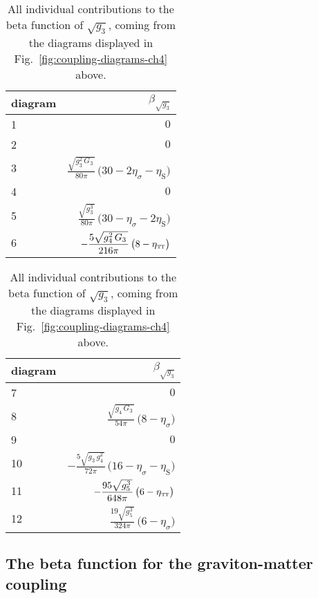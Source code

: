 \documentclass[11pt]{book}
\newcommand\TTspace{ -1pt }
\newcommand\etaTT{ \eta_{\scriptscriptstyle{\mathrm{T\hspace{\TTspace}T}}} }
\newcommand\etaS{ \eta_{\scriptscriptstyle{\mathrm{S}}} }
\numberwithin{equation}{chapter}
\begin{document}
{
  \setlength{\extrarowheight}{10pt}
  \begin{table}[p]
    \begin{center}
      \begin{tabular}{ l r }
        \toprule
        diagram &  $\beta_{\sqrt{g_3}}$ \\
        \midrule
         1 &  $\displaystyle 0$ \\
         2 &  $\displaystyle 0$ \\
         3 &  $\displaystyle \frac{\sqrt{g_3^2 \, G_3 \,}}{80\pi} \, \big( 30 - 2\eta_\sigma - \etaS \big)$ \\
         4 &  $\displaystyle 0$ \\
         5 &  $\displaystyle \frac{\sqrt{g_3^3 \,}}{80 \pi} \, \big( 30 -\eta_\sigma - 2 \etaS \big)$ \\
         6 &  $\displaystyle -\frac{5 \sqrt{g_4^2 \, G_3 \,}}{216 \pi}  \, \big( 8 - \etaTT \big)$ \\
        \bottomrule
      \end{tabular}
      \hspace{3mm}
      \begin{tabular}{ l r }
        \toprule
        diagram &  $\beta_{\sqrt{g_3}}$ \\
        \midrule
         7 & $\displaystyle 0$ \\
         8 & $\displaystyle \frac{\sqrt{g_4 \, G_3 \,}}{54 \pi} \, \big( 8 - \eta_\sigma \big)$ \\
         9 & $\displaystyle 0$ \\
        10 & $\displaystyle -\frac{5 \sqrt{g_3 \, g_4^2 \,}}{72 \pi} \, \big( 16 - \eta_\sigma - \etaS \big)$ \\
        11 & $\displaystyle -\frac{95 \sqrt{g_5^3 \,}}{648 \pi} \, \big( 6 - \etaTT \big)$ \\
        12 & $\displaystyle \frac{19 \sqrt{g_5^3\,}}{324 \pi} \, \big( 6 - \eta_\sigma \big)$ \\
        \bottomrule
      \end{tabular}
    \end{center}
    \caption[Coordinates and critical exponents of fixed points in perturbative approximation]
    {
      All individual contributions to the beta function of $\sqrt{g_3}$,
      coming from the diagrams displayed in Fig.~\ref{fig:coupling-diagrams-ch4} above.
    }
    \label{tab:coupling-diagrams-ch4}
  \end{table}
}


\subsection{The beta function for the graviton-matter coupling}
\end{document}
